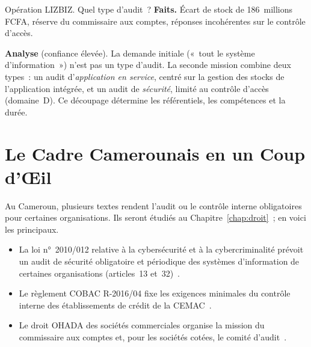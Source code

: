 \begin{boxscenario}{Opération LIZBIZ. Quel type d'audit~?}
\textbf{Faits.} Écart de stock de 186~millions FCFA, réserve du
commissaire aux comptes, réponses incohérentes sur le contrôle d'accès.

\medskip
\textbf{Analyse} (confiance élevée). La demande initiale («~tout le
système d'information~») n'est pas un type d'audit. La seconde mission
combine deux types~: un audit d'\emph{application en service}, centré sur
la gestion des stocks de l'application intégrée, et un audit de
\emph{sécurité}, limité au contrôle d'accès (domaine~D). Ce découpage
détermine les référentiels, les compétences et la durée.
\end{boxscenario}

\section{Le Cadre Camerounais en un Coup d'Œil}
\label{sec:c01-cadre}

Au Cameroun, plusieurs textes rendent l'audit ou le contrôle interne
obligatoires pour certaines organisations. Ils seront étudiés au
Chapitre~\ref{chap:droit}~; en voici les principaux.

\begin{itemize}
    \item La loi n°~2010/012 relative à la cybersécurité et à la
          cybercriminalité prévoit un audit de sécurité obligatoire et
          périodique des systèmes d'information de certaines organisations
          (articles~13 et~32)~\cite{loi2010012}.
    \item Le règlement COBAC R-2016/04 fixe les exigences minimales du
          contrôle interne des établissements de crédit de la
          CEMAC~\cite{cobac2016r04}.
    \item Le droit OHADA des sociétés commerciales organise la mission du
          commissaire aux comptes et, pour les sociétés cotées, le comité
          d'audit~\cite{ohada2014auscgie}.
\end{itemize}

